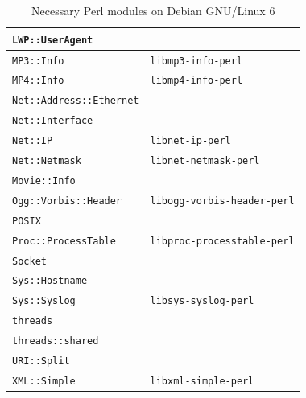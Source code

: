 \documentclass[a4paper,oneside,10pt]{report}
\begin{document}
\begin{table}
\begin{tabular}{|p{15em}|p{17em}|}
		\hline
		\verb|LWP::UserAgent| 						& \\
		\hline
		\verb|MP3::Info| 									& \verb|libmp3-info-perl| \\
		\hline
		\verb|MP4::Info| 									& \verb|libmp4-info-perl| \\
		\hline
		\verb|Net::Address::Ethernet| 		& \\
		\hline
		\verb|Net::Interface| 						& \\
		\hline
		\verb|Net::IP| 										& \verb|libnet-ip-perl| \\
		\hline
		\verb|Net::Netmask| 							& \verb|libnet-netmask-perl| \\
		\hline
		\verb|Movie::Info| 								& \\
		\hline
		\verb|Ogg::Vorbis::Header| 				& \verb|libogg-vorbis-header-perl| \\
		\hline
		\verb|POSIX| 											& \\
		\hline
		\verb|Proc::ProcessTable| 				& \verb|libproc-processtable-perl| \\
		\hline
		\verb|Socket| 										& \\
		\hline
		\verb|Sys::Hostname| 							& \\
		\hline
		\verb|Sys::Syslog| 								& \verb|libsys-syslog-perl| \\
		\hline
		\verb|threads| 										& \\
		\hline
		\verb|threads::shared| 						& \\
		\hline
		\verb|URI::Split| 								& \\
		\hline
		\verb|XML::Simple| 								& \verb|libxml-simple-perl| \\
		\hline
	\end{tabular}
	\caption{Necessary Perl modules on Debian GNU/Linux 6}
	\label{tab:NecessaryPerlModulesDebian6}
\end{table}
\end{document}
